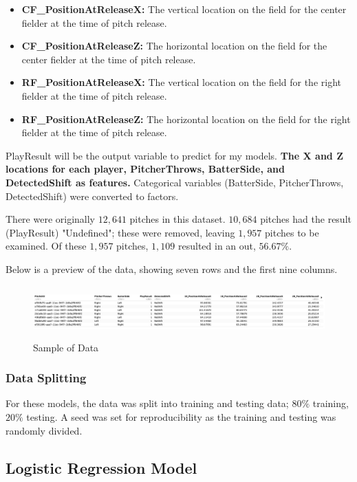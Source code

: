 \documentclass{article}
\begin{document}
\begin{itemize}
    \item \textbf{CF\_PositionAtReleaseX:} The vertical location on the field for the center fielder at the time of pitch release.
    \item \textbf{CF\_PositionAtReleaseZ:} The horizontal location on the field for the center fielder at the time of pitch release.
    \item \textbf{RF\_PositionAtReleaseX:} The vertical location on the field for the right fielder at the time of pitch release.
    \item \textbf{RF\_PositionAtReleaseZ:} The horizontal location on the field for the right fielder at the time of pitch release.
\end{itemize}

PlayResult will be the output variable to predict for my models. \textbf{The X and Z locations for each player, PitcherThrows, BatterSide, and DetectedShift as features.} Categorical variables (BatterSide, PitcherThrows, DetectedShift) were converted to factors. 

There were originally $12,641$ pitches in this dataset. $10,684$ pitches had the result (PlayResult) "Undefined"; these were removed, leaving $1,957$ pitches to be examined. Of these $1,957$ pitches, $1,109$ resulted in an out, $56.67\%$. 

Below is a preview of the data, showing seven rows and the first nine columns. 

\begin{figure}[h]
    \centering
    \includegraphics[height=2cm]{images/data_preview.png}
    \caption{Sample of Data}
\end{figure}

\subsubsection{Data Splitting}
For these models, the data was split into training and testing data; $80\%$ training, $20\%$ testing. A seed was set for reproducibility as the training and testing was randomly divided. 


\subsection{Logistic Regression Model}
\end{document}
